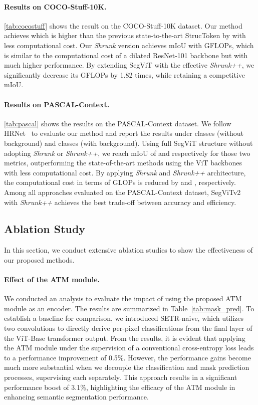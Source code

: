 \paragraph{Results on COCO-Stuff-10K.}
\cref{tab:cocostuff} shows the result on the COCO-Stuff-10K dataset. Our method achieves  which is higher than the previous state-to-the-art StrucToken by  with less computational cost. Our \emph{Shrunk} version achieves  mIoU with  GFLOPs, which is similar to the computational cost of a dilated ResNet-101 backbone but with much higher performance. By extending SegViT with the effective \emph{Shrunk++}, we significantly decrease its GFLOPs by 1.82 times, while retaining a competitive mIoU.





\paragraph{Results on PASCAL-Context.}
\cref{tab:pascal} shows the results on the PASCAL-Context dataset. We follow HRNet~\cite{hrnet} to evaluate our method and report the results  under  classes (without background) and  classes (with background). 
Using full SegViT structure without adopting \emph{Shrunk} or \emph{Shrunk++}, we reach mIoU of  and  respectively for those two metrics, outperforming the state-of-the-art methods using the ViT backbones with less computational cost. By applying \emph{Shrunk} and \emph{Shrunk++} architecture, the computational cost in terms of GLOPs is reduced by  and , respectively. Among all approaches evaluated on the PASCAL-Context dataset, SegViTv2 with \emph{Shrunk++} achieves the best trade-off between accuracy and efficiency.



\subsection{Ablation Study}
In this section, we conduct extensive ablation studies to show the effectiveness of our proposed methods. 



\paragraph{Effect of the ATM module.} We conducted an analysis to evaluate the impact of using the proposed ATM module as an encoder. The results are summarized in Table~\ref{tab:mask_pred}. To establish a baseline for comparison, we introduced SETR-naive, which utilizes two  convolutions to directly derive per-pixel classifications from the final layer of the ViT-Base transformer output.
From the results, it is evident that applying the ATM module under the supervision of a conventional cross-entropy loss leads to a performance improvement of 0.5\%. However, the performance gains become much more substantial when we decouple the classification and mask prediction processes, supervising each separately. This approach results in a significant performance boost of 3.1\%, highlighting the efficacy of the ATM module in enhancing semantic segmentation performance.

